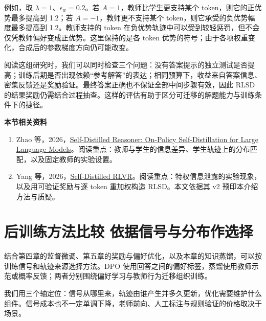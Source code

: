 例如，取 $\lambda=1$、$\epsilon_w=0.2$。若 $A=1$，教师比学生更支持某个 token，则它的正优势最多提高到 1.2；若 $A=-1$，教师更不支持某个 token，则它承受的负优势幅度最多提高到 1.2。教师支持的 token 在负优势轨迹中可以受到较轻惩罚，但不会仅凭教师偏好变成正优势。这里保持的是各 token 优势的符号；由于各项权重变化，合成后的参数梯度方向仍可能改变。

阅读这组研究时，我们可以同时检查三个问题：没有答案提示的独立测试是否提高；训练后期是否出现依赖``参考解答''的表达；相同预算下，收益来自答案信息、密集反馈还是奖励验证。最终答案正确也不保证全部中间步骤有效，因此 RLSD 的结果奖励仍需结合过程抽查。这样的评估有助于区分可迁移的解题能力与训练条件下的捷径。

\textbf{本节相关资料}
\begin{enumerate}
    \item Zhao 等，2026，\href{https://arxiv.org/abs/2601.18734v3}{Self-Distilled Reasoner: On-Policy Self-Distillation for Large Language Models}。阅读重点：教师与学生的信息差异、学生轨迹上的分布匹配，以及固定教师的实验设置。
    \item Yang 等，2026，\href{https://arxiv.org/abs/2604.03128v2}{Self-Distilled RLVR}。阅读重点：特权信息泄露的实验现象，以及用可验证奖励与逐 token 重加权构造 RLSD。本文依据其 v2 预印本介绍方法与质疑。
\end{enumerate}

\section{后训练方法比较 依据信号与分布作选择}\label{后训练方法比较 依据信号与分布作选择}

结合第四章的监督微调、第五章的奖励与偏好优化，以及本章的知识蒸馏，可以按训练信号和轨迹来源选择方法。DPO 使用回答之间的偏好标签，蒸馏使用教师示范或概率反馈；两者分别围绕偏好学习与教师行为迁移组织训练。

我们用三个轴定位：信号从哪里来，轨迹由谁产生并多久更新，优化需要维护什么组件。信号成本也不一定单调下降，老师前向、人工标注与规则验证的价格取决于场景。


